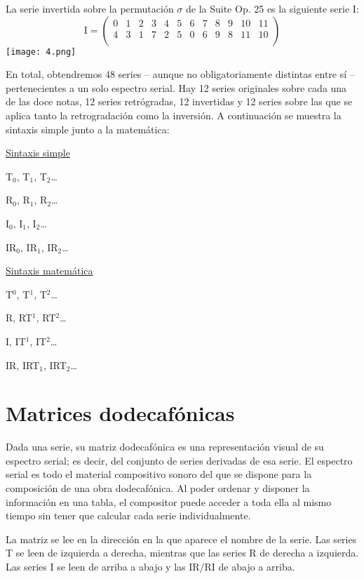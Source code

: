 		La serie invertida sobre la permutación $\sigma$ de la Suite Op. 25 es la siguiente serie I:
		\[
		\text{I}=\left(\begin{matrix}0&1&2&3&4&5&6&7&8&9&10&11\\4&3&1&7&2&5&0&6&9&8&11&10\\\end{matrix}\right)
		\]		
		\texttt{[image: 4.png]}
				
		En total, obtendremos 48 series -- aunque no obligatoriamente distintas entre sí -- pertenecientes a un solo espectro serial. Hay 12 series originales sobre cada una de las doce notas, 12 series retrógradas, 12 invertidas y 12 series sobre las que se aplica tanto la retrogradación como la inversión. A continuación se muestra la sintaxis simple junto a la matemática:
		
		\begin{center}
		\begin{multicols}{2}
			\underline{Sintaxis simple}
			
			T$_0$, T$_1$, T$_2$\ldots
			
			R$_0$, R$_1$, R$_2$\ldots
			
			I$_0$, I$_1$, I$_2$\ldots
			
			IR$_0$, IR$_1$, IR$_2$\ldots
			
			\underline{Sintaxis matemática}
			
			T$^0$, T$^1$, T$^2$\ldots
			
			R, RT$^1$, RT$^2$\ldots
			
			I, IT$^1$, IT$^2$\ldots
			
			IR, IRT$_1$, IRT$_2$\ldots
		\end{multicols}
		\end{center}
	
	\section{Matrices dodecafónicas}
		
		Dada una serie, su matriz dodecafónica es una representación visual de su espectro serial; es decir, del conjunto de series derivadas de esa serie. El espectro serial es todo el material compositivo sonoro del que se dispone para la composición de una obra dodecafónica. Al poder ordenar y disponer la información en una tabla, el compositor puede acceder a toda ella al mismo tiempo sin tener que calcular cada serie individualmente.		
		
		La matriz se lee en la dirección en la que aparece el nombre de la serie. Las series T se leen de izquierda a derecha, mientras que las series R de derecha a izquierda. Las series I se leen de arriba a abajo y las IR/RI de abajo a arriba.
		
